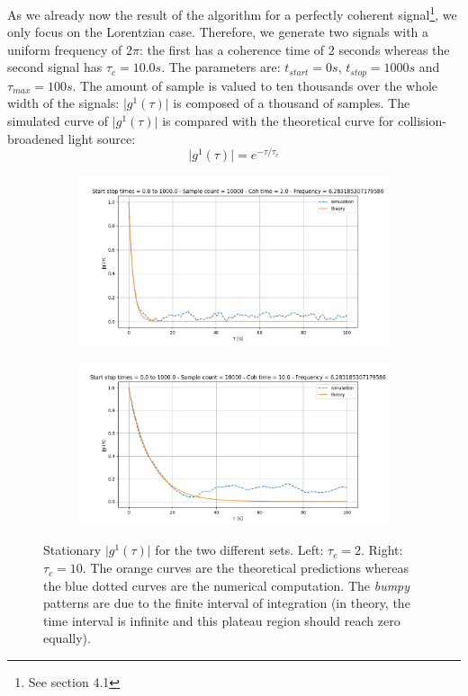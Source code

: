 \documentclass[11pt]{report}
\begin{document}
As we already now the result of the algorithm for a perfectly coherent signal\footnote{See section 4.1}, we only focus on the Lorentzian case. Therefore, we generate two signals with a uniform frequency of $2\pi$: the first has a coherence time of 2 seconds whereas the second signal has $\tau_c = 10.0s$. The parameters are: $t_{start} = 0s$, $t_{stop} = 1000s$ and $\tau_{max}=100s$. The amount of sample is valued to ten thousands over the whole width of the signals: $\vert g^1(\tau) \vert$ is composed of a thousand of samples. The simulated curve of $\vert g^1(\tau) \vert$ is compared with the theoretical curve for collision-broadened light source:
\begin{equation}
\vert g^1(\tau) \vert = e^{-\tau/\tau_c}
\end{equation}

\begin{figure}[h!]
\centering
\begin{subfigure}{.48\textwidth}
  \centering
  \includegraphics[width=1.1\linewidth]{test_stat_2}
\end{subfigure}%
\hspace{1em}%
\begin{subfigure}{.48\textwidth}
  \centering
  \includegraphics[width=1.1\linewidth]{test_stat_10}
\end{subfigure}
\caption{Stationary $\vert g^1(\tau) \vert$ for the two different sets. Left: $\tau_c=2$. Right: $\tau_c=10$. The orange curves are the theoretical predictions whereas the blue dotted curves are the numerical computation. The \textit{bumpy} patterns are due to the finite interval of integration (in theory, the time interval is infinite and this plateau region should reach zero equally).}
\end{figure}
\end{document}
